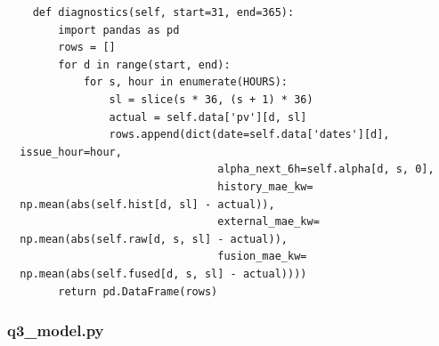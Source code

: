 \begin{verbatim}
    def diagnostics(self, start=31, end=365):
        import pandas as pd
        rows = []
        for d in range(start, end):
            for s, hour in enumerate(HOURS):
                sl = slice(s * 36, (s + 1) * 36)
                actual = self.data['pv'][d, sl]
                rows.append(dict(date=self.data['dates'][d],
  issue_hour=hour,
                                 alpha_next_6h=self.alpha[d, s, 0],
                                 history_mae_kw=
  np.mean(abs(self.hist[d, sl] - actual)),
                                 external_mae_kw=
  np.mean(abs(self.raw[d, s, sl] - actual)),
                                 fusion_mae_kw=
  np.mean(abs(self.fused[d, s, sl] - actual))))
        return pd.DataFrame(rows)
\end{verbatim}

\subsubsection*{q3\_model.py}
